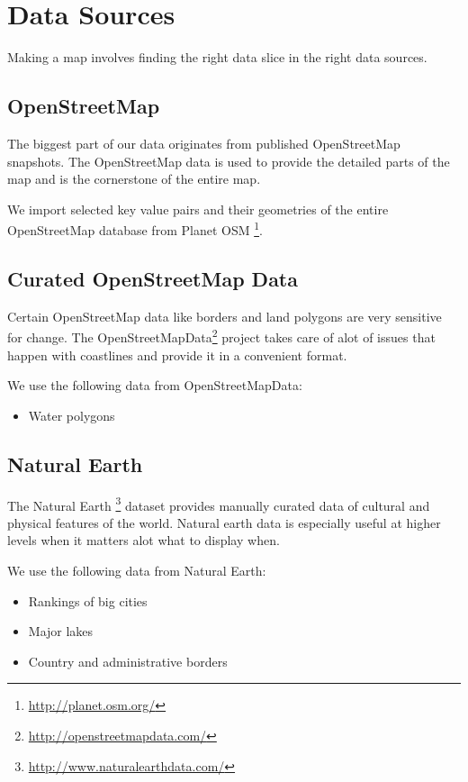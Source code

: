 \chapter{Data Sources}
\label{data-sources}

Making a map involves finding the right data slice in the right
data sources.

\section{OpenStreetMap}

The biggest part of our data originates from published OpenStreetMap snapshots. The OpenStreetMap data is used to provide the detailed parts of the map and is the cornerstone of the entire map.

We import selected key value pairs and their geometries of the entire OpenStreetMap database from Planet OSM \footnote{\url{http://planet.osm.org/}}.


\section{Curated OpenStreetMap Data}

Certain OpenStreetMap data like borders and land polygons are very sensitive for change.
The OpenStreetMapData\footnote{\url{http://openstreetmapdata.com/}}
project takes care of alot of issues that happen with coastlines
and provide it in a convenient format.

We use the following data from OpenStreetMapData:

\begin{itemize}
\item Water polygons
\end{itemize}

\section{Natural Earth}

The Natural Earth \footnote{\url{http://www.naturalearthdata.com/}} dataset provides manually curated data of cultural and physical features of the world. Natural earth data is especially useful at higher levels when it matters alot what to display when.

We use the following data from Natural Earth:

\begin{itemize}
\item Rankings of big cities
\item Major lakes
\item Country and administrative borders
\end{itemize}